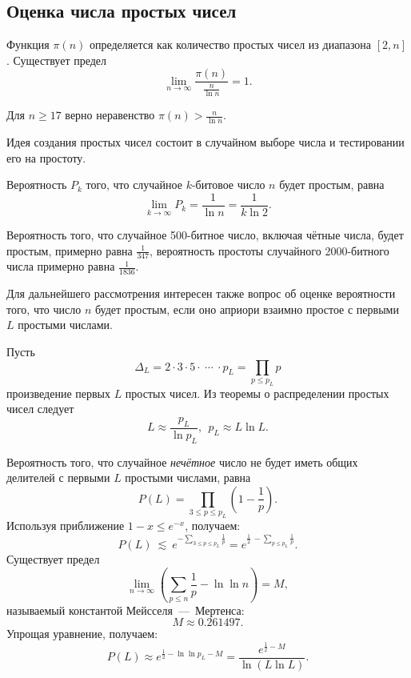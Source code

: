 \subsection{Оценка числа простых чисел}

Функция $\pi(n)$ определяется как количество простых чисел из диапазона $[2, n]$.
Существует предел~\cite{Selberg:1949}
    \[ \lim\limits_{n \rightarrow \infty}\frac{ \pi(n)}{ \frac{n}{\ln n}}=1. \]

Для $n \geq 17$ верно неравенство $\pi(n) > \frac{n}{\ln n}$.

Идея создания простых чисел состоит в случайном выборе числа и тестировании его на простоту.

Вероятность $P_k$ того, что случайное $k$-битовое число $n$ будет простым, равна
    \[ \lim\limits_{k \rightarrow \infty} P_k = \frac{1}{\ln n} = \frac{1}{k \ln 2}. \]

\example
    Вероятность того, что случайное 500-битное число, включая чётные числа, будет простым, примерно равна $\frac{1}{347}$, вероятность простоты случайного 2000-битного числа примерно равна $\frac{1}{1836}$.
\exampleend

Для дальнейшего рассмотрения интересен также вопрос об оценке вероятности того, что число $n$ будет простым, если оно априори взаимно простое с первыми $L$ простыми числами.

Пусть
    \[ \Delta_L = 2 \cdot 3 \cdot 5 \cdot ~\cdots~ \cdot p_L = \prod \limits_{p \leq p_L} p \]
произведение первых $L$ простых чисел. Из теоремы о распределении простых чисел следует
    \[ L \approx \frac{p_L}{\ln p_L}, ~~ p_L \approx L \ln L. \]

Вероятность того, что случайное \emph{нечётное} число не будет иметь общих делителей с первыми $L$ простыми числами, равна
    \[ P(L) = \prod \limits_{3 \leq p \leq p_L} \left( 1 - \frac{1}{p} \right). \]
Используя приближение $1-x \leq e^{-x}$, получаем:
    \[ P(L) ~\lesssim~ e^{-\sum\limits_{3 \leq p \leq p_L} \frac{1}{p}} = e^{\frac{1}{2} ~ - \sum\limits_{p \leq p_L} \frac{1}{p}}. \]
Существует предел
    \[ \lim \limits_{n \rightarrow \infty} \left( \sum \limits_{p \leq n} \frac{1}{p} - \ln \ln n \right) = M, \]
называемый константой Мейсселя~---~Мертенса:
    \[ M \approx 0.261497. \]
Упрощая уравнение, получаем:
    \[ P(L) \approx e^{\frac{1}{2} - \ln \ln p_L - M} = \frac{e^{\frac{1}{2} - M}}{\ln(L \ln L)}. \]

